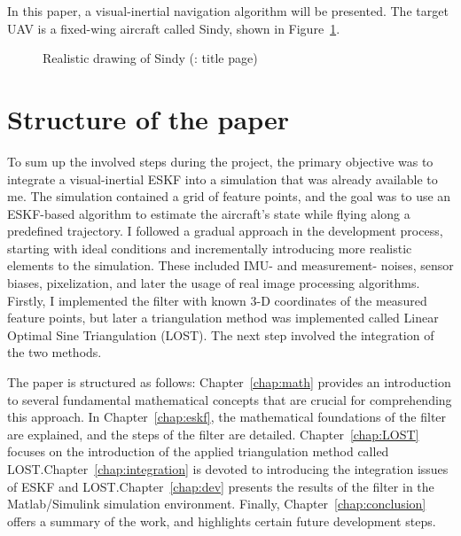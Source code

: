 In this paper, a visual-inertial navigation algorithm will be presented. The target UAV is a fixed-wing aircraft called Sindy, shown in Figure~\ref{fig:sindy}.
\begin{figure}[!ht]
    \centering
    
    \caption{Realistic drawing of Sindy (\cite{sindy-manual}: title page)}\label{fig:sindy}
\end{figure}

\section{Structure of the paper}

To sum up the involved steps during the project, the primary objective was to integrate a visual-inertial ESKF into a simulation that was already available to me. The simulation contained a grid of feature points, and the goal was to use an ESKF-based algorithm to estimate the aircraft's state while flying along a predefined trajectory. I followed a gradual approach in the development process, starting with ideal conditions and incrementally introducing more realistic elements to the simulation. These included IMU- and measurement- noises, sensor biases, pixelization, and later the usage of real image processing algorithms. Firstly, I implemented the filter with known 3-D coordinates of the measured feature points, but later a triangulation method was implemented called Linear Optimal Sine Triangulation (LOST). The next step involved the integration of the two methods. 

The paper is structured as follows: Chapter~\ref{chap:math} provides an introduction to several fundamental mathematical concepts that are crucial for comprehending this approach. In Chapter~\ref{chap:eskf}, the mathematical foundations of the filter are explained, and the steps of the filter are detailed. Chapter~\ref{chap:LOST} focuses on the introduction of the applied triangulation method called LOST.\@ Chapter~\ref{chap:integration} is devoted to introducing the integration issues of ESKF and LOST.\@ Chapter~\ref{chap:dev} presents the results of the filter in the Matlab/Simulink simulation environment. Finally, Chapter~\ref{chap:conclusion} offers a summary of the work, and highlights certain future development steps.